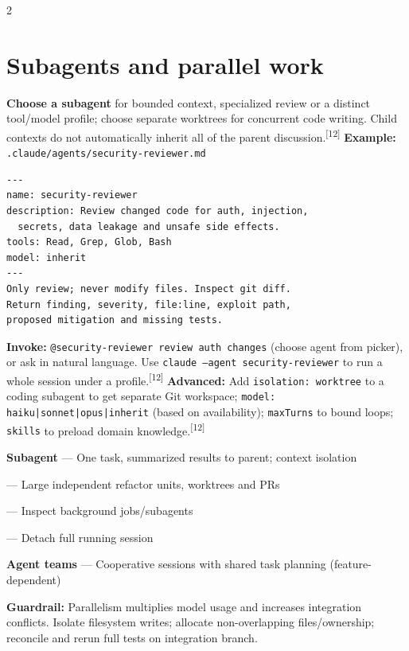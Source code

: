 \documentclass[9pt,a4paper]{extarticle}
\newcommand{\kw}[1]{\textbf{\color{navy}#1}}
\newcommand{\cmd}[1]{{\footnotesize\color{navy}\texttt{#1}}}
\newcommand{\src}[1]{\textsuperscript{\color{blue}[#1]}}
\newcommand{\warn}[1]{\par\textbf{\color{amber}Guardrail:} #1\par}
\newenvironment{tablist}{\begin{list}{}{\setlength{\leftmargin}{0pt}\setlength{\rightmargin}{0pt}\setlength{\itemindent}{0pt}\setlength{\itemsep}{1.4pt}\setlength{\parsep}{0pt}\setlength{\topsep}{2pt}}\fontsize{7.7}{9.3}\selectfont}{\end{list}}
\newcommand{\trow}[2]{\item \textbf{\color{navy}#1} \textcolor{slate}{---} #2}
\begin{document}
\begin{multicols}{2}
\section{Subagents and parallel work}
\kw{Choose a subagent} for bounded context, specialized review or a distinct tool/model profile; choose separate worktrees for concurrent code writing. Child contexts do not automatically inherit all of the parent discussion.\src{12}
\kw{Example:} \cmd{.claude/agents/security-reviewer.md}
\begin{lstlisting}
---
name: security-reviewer
description: Review changed code for auth, injection,
  secrets, data leakage and unsafe side effects.
tools: Read, Grep, Glob, Bash
model: inherit
---
Only review; never modify files. Inspect git diff.
Return finding, severity, file:line, exploit path,
proposed mitigation and missing tests.
\end{lstlisting}
\kw{Invoke:} \cmd{@security-reviewer review auth changes} (choose agent from picker), or ask in natural language. Use \cmd{claude --agent security-reviewer} to run a whole session under a profile.\src{12}
\kw{Advanced:} Add \cmd{isolation: worktree} to a coding subagent to get separate Git workspace; \cmd{model: haiku|sonnet|opus|inherit} (based on availability); \cmd{maxTurns} to bound loops; \cmd{skills} to preload domain knowledge.\src{12}
\begin{tablist}
\trow{Subagent}{One task, summarized results to parent; context isolation}
\trow{\cmd{/batch}}{Large independent refactor units, worktrees and PRs}
\trow{\cmd{/tasks}}{Inspect background jobs/subagents}
\trow{\cmd{/background}}{Detach full running session}
\trow{Agent teams}{Cooperative sessions with shared task planning (feature-dependent)}
\end{tablist}
\warn{Parallelism multiplies model usage and increases integration conflicts. Isolate filesystem writes; allocate non-overlapping files/ownership; reconcile and rerun full tests on integration branch.}


\end{multicols}
\end{document}
